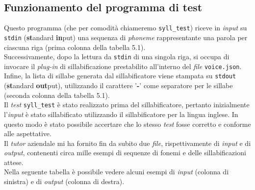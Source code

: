  \subsection{Funzionamento del programma di test}
  Questo programma (che per comodità chiameremo \texttt{syll\_test}) riceve in \textit{input} su \texttt{stdin}
  (\textbf{st}andard \textbf{in}put) una sequenza di \textit{phoneme} rappresentante una parola per 
  ciascuna riga (prima colonna della tabella 5.1). \\
  Successivamente, dopo la lettura 
  da \texttt{stdin}  di una singola riga, si occupa di invocare il \textit{plug-in} di sillabificazione prestabilito
  all'interno del \textit{file} \texttt{voice.json}. \\ Infine, la lista di sillabe generata dal sillabificatore
  viene stampata su \texttt{stdout} (\textbf{st}andard \textbf{out}put), utilizzando il carattere '\textbf{-}' come separatore per le sillabe 
  (seconda colonna della   tabella 5.1). \\
  Il \textit{test} \texttt{syll\_test} è stato realizzato prima del sillabificatore, pertanto inizialmente l'\textit{input}
  è stato sillabificato utilizzando il sillabificatore per la lingua inglese. In questo modo è stato possibile accertare
  che lo stesso \textit{test} fosse corretto e conforme alle aspettative. \\
  Il \textit{tutor} aziendale mi ha fornito fin da subito due \textit{file}, rispettivamente di \textit{input} e 
  di \textit{output}, contenenti circa mille esempi di sequenze di fonemi e delle sillabificazioni attese.  \\ 
  Nella seguente tabella è possibile vedere alcuni esempi di \textit{input} (colonna di sinistra) e di
  \textit{output} (colonna di destra).
